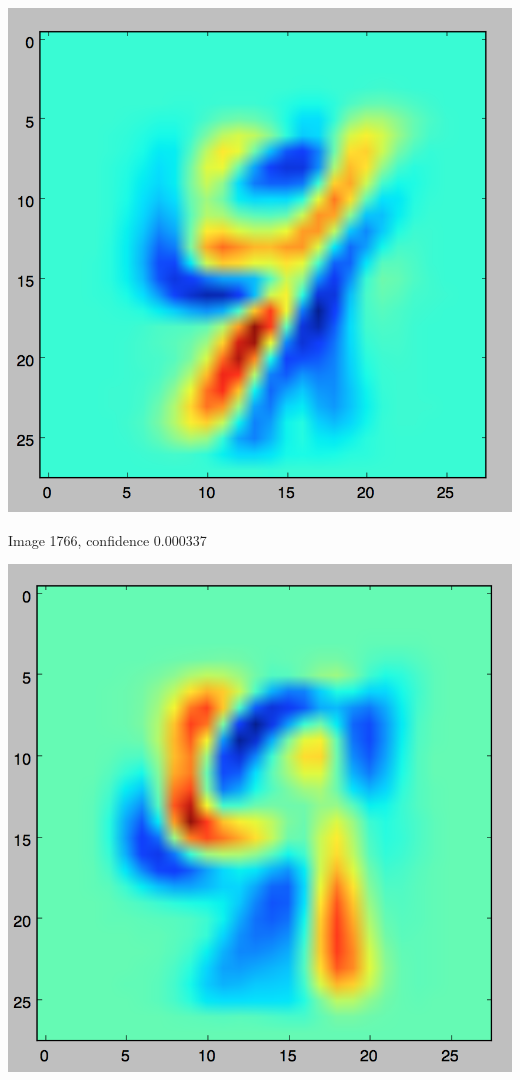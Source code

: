 \documentclass[twoside,11pt]{homework}
\begin{document}
\includegraphics[scale=.5]{images/1555.png}

Image 1766, confidence 0.000337

\includegraphics[scale=.5]{images/1766.png}
\end{document}
